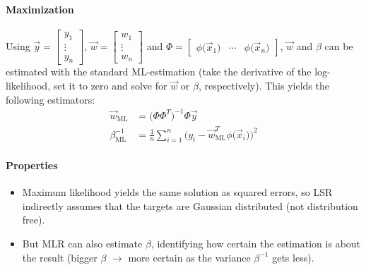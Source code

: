 			\paragraph{Maximization}
				Using \( \vec{y} = \begin{bmatrix} y_1 \\ \vdots \\ y_n \end{bmatrix} \), \( \vec{w} = \begin{bmatrix} w_1 \\ \vdots \\ w_n \end{bmatrix} \) and \( \Phi = \begin{bmatrix} \phi\big(\vec{x}_1\big) & \cdots & \phi\big(\vec{x}_n\big) \end{bmatrix} \), \(\vec{w}\) and \(\beta\) can be estimated with the standard ML-estimation (take the derivative of the log-likelihood, set it to zero and solve for \(\vec{w}\) or \(\beta\), respectively). This yields the following estimators:
				\begin{align*}
					\vec{w}_\textrm{ML} &= \big(\Phi \Phi^T\big)^{-1} \Phi \vec{y} \\
					\beta_\textrm{ML}^{-1} &= \frac{1}{n} \sum_{i = 1}^{n} \Big(y_i - \vec{w}_\textrm{ML}^T \phi\big(\vec{x}_i\big)\Big)^2
				\end{align*}

			\paragraph{Properties}
				\begin{itemize}
					\item Maximum likelihood yields the same solution as squared errors, so LSR indirectly assumes that the targets are Gaussian distributed (not distribution free).
					\item But MLR can also estimate \(\beta\), identifying how certain the estimation is about the result (bigger \(\beta\) \(\to\) more certain as the variance \(\beta^{-1}\) gets less).
				\end{itemize}

